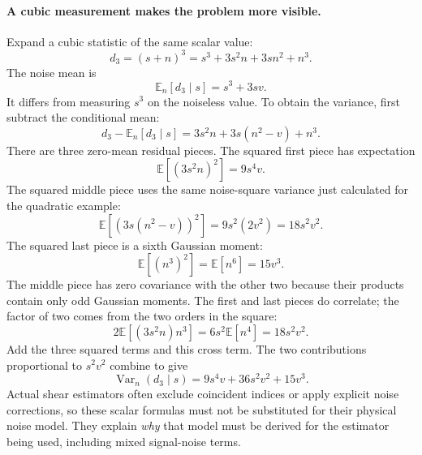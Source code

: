 \documentclass[11pt]{article}
\newcommand{\E}{\mathbb{E}}
\newcommand{\Var}{\operatorname{Var}}
\begin{document}
\paragraph{A cubic measurement makes the problem more visible.}
Expand a cubic statistic of the same scalar value:
\begin{equation}
 d_3=(s+n)^3=s^3+3s^2n+3sn^2+n^3.
\end{equation}
The noise mean is
\begin{equation}
 \E_n[d_3\mid s]=s^3+3sv.
\end{equation}
It differs from measuring $s^3$ on the noiseless value. To obtain the
variance, first subtract the conditional mean:
\begin{equation}
 d_3-\E_n[d_3\mid s]=3s^2n+3s(n^2-v)+n^3.
\end{equation}
There are three zero-mean residual pieces. The squared first piece has
expectation
\begin{equation}
 \E[(3s^2n)^2]=9s^4v.
\end{equation}
The squared middle piece uses the same noise-square variance just
calculated for the quadratic example:
\begin{equation}
 \E[(3s(n^2-v))^2]=9s^2(2v^2)=18s^2v^2.
\end{equation}
The squared last piece is a sixth Gaussian moment:
\begin{equation}
 \E[(n^3)^2]=\E[n^6]=15v^3.
\end{equation}
The middle piece has zero covariance with the other two because their
products contain only odd Gaussian moments. The first and last pieces
do correlate; the factor of two comes from the two orders in the square:
\begin{equation}
 2\E[(3s^2n)n^3]=6s^2\E[n^4]=18s^2v^2.
\end{equation}
Add the three squared terms and this cross term. The two contributions
proportional to $s^2v^2$ combine to give
\begin{equation}
 \Var_n(d_3\mid s)=9s^4v+36s^2v^2+15v^3.
\end{equation}
Actual shear estimators often exclude coincident indices or apply explicit
noise corrections, so these scalar formulas must not be substituted for
their physical noise model. They explain \emph{why} that model must be
derived for the estimator being used, including mixed signal-noise terms.
\end{document}
